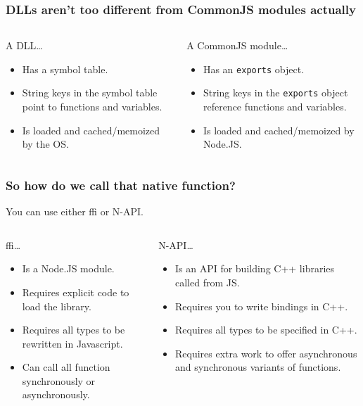 \begin{frame}
	\frametitle{DLLs aren’t too different from CommonJS modules actually}

	\begin{columns}
	\begin{column}{0.5\textwidth}
		A DLL…

		\begin{itemize}
			\item Has a symbol table.
			\item String keys in the symbol table point to functions and variables.
			\item Is loaded and cached/memoized by the OS.
		\end{itemize}
	\end{column}
	\begin{column}{0.5\textwidth}
		A CommonJS module…

		\begin{itemize}
			\item Has an \texttt{exports} object.
			\item String keys in the \texttt{exports} object reference functions and variables.
			\item Is loaded and cached/memoized by Node.JS.
		\end{itemize}
	\end{column}
	\end{columns}
\end{frame}

\begin{frame}
	\frametitle{So how do we call that native function?}

	You can use either ffi or N-API. \vspace{1em}

	\begin{columns}[t]
		\begin{column}{0.5\textwidth}
			ffi…
			\begin{itemize}
				\item Is a Node.JS module.
				\item Requires explicit code to load the library.
				\item Requires all types to be rewritten in Javascript.
				\item Can call all function synchronously or asynchronously.
			\end{itemize}
		\end{column}
		\begin{column}{0.5\textwidth}
			N-API…
			\begin{itemize}
				\item Is an API for building C++ libraries called from JS.
				\item Requires you to write bindings in C++.
				\item Requires all types to be specified in C++.
				\item Requires extra work to offer asynchronous and synchronous
					variants of functions.
			\end{itemize}
		\end{column}
	\end{columns}
\end{frame}

